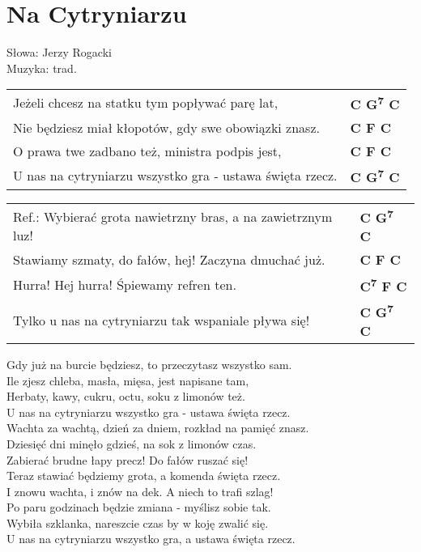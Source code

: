 \section{Na Cytryniarzu}

Słowa: Jerzy Rogacki\\
Muzyka:  trad.

\vspace{2em}
\begin{tabular}{@{}p{10cm}@{}l@{}}
Jeżeli chcesz na statku tym popływać parę lat,             & \bfseries   C G\textsuperscript{7} C \\
Nie będziesz miał kłopotów, gdy swe obowiązki znasz.       & \bfseries   C F C \\
O prawa twe zadbano też, ministra podpis jest,             & \bfseries   C F C \\
U nas na cytryniarzu wszystko gra - ustawa święta rzecz.   & \bfseries   C G\textsuperscript{7} C \\
\end{tabular}

\vspace{1em}
\begin{tabular}{@{}p{10cm}@{}l@{}}
Ref.: Wybierać grota nawietrzny bras, a na zawietrznym luz!   & \bfseries   C G\textsuperscript{7} C \\
Stawiamy szmaty, do fałów, hej! Zaczyna dmuchać już.    & \bfseries   C F C \\
Hurra! Hej hurra! Śpiewamy refren ten.                  & \bfseries   C\textsuperscript{7} F C \\
Tylko u nas na cytryniarzu tak wspaniale pływa się!     & \bfseries   C G\textsuperscript{7} C \\
\end{tabular}

\vspace{1em}
Gdy już na burcie będziesz, to przeczytasz wszystko sam. \\
Ile zjesz chleba, masła, mięsa, jest napisane tam, \\
Herbaty, kawy, cukru, octu, soku z limonów też. \\
U nas na cytryniarzu wszystko gra - ustawa święta rzecz. \\

Wachta za wachtą, dzień za dniem, rozkład na pamięć znasz. \\
Dziesięć dni minęło gdzieś, na sok z limonów czas. \\
Zabierać brudne łapy precz! Do fałów ruszać się! \\
Teraz stawiać będziemy grota, a komenda święta rzecz. \\

I znowu wachta, i znów na dek. A niech to trafi szlag! \\
Po paru godzinach będzie zmiana - myślisz sobie tak. \\
Wybiła szklanka, nareszcie czas by w koję zwalić się. \\
U nas na cytryniarzu wszystko gra, a ustawa święta rzecz. \\